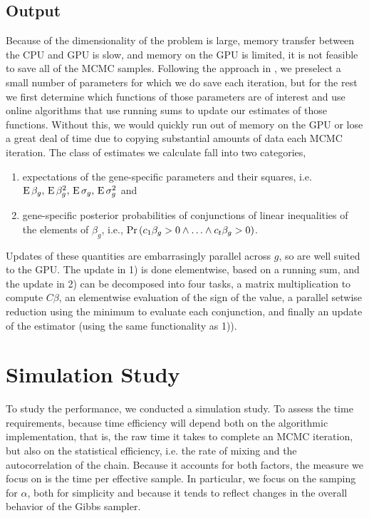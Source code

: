 \subsection{Output}
\label{subsec:output}
Because of the dimensionality of the problem is large, memory transfer between the CPU and GPU is slow, and memory on the GPU is limited, it is not feasible to save all of the MCMC samples. Following the approach in \citet{landau2016fully}, we preselect a small number of parameters for which we do save each iteration, but for the rest we first determine which functions of those parameters are of interest and use online algorithms that use running sums to update our estimates of those functions. Without this, we would quickly run out of memory on the GPU or lose a great deal of time due to copying substantial amounts of data each MCMC iteration. The class of estimates we calculate fall into two categories,
\begin{enumerate}
\item expectations of the gene-specific parameters and their squares, i.e. $\operatorname{E} \beta_g,\, \operatorname{E} \beta_g^2,\, \operatorname{E}\sigma_g,\, \operatorname{E}\sigma_g^2$ and 
\item gene-specific posterior probabilities of conjunctions of linear
  inequalities of the elements of $\beta_g$, i.e.,
  $\operatorname{Pr}\left(c_1\beta_g > 0 \land \ldots \land c_t\beta_g > 0\right)$.
\end{enumerate}
Updates of these quantities are embarrasingly parallel across $g$, so are well suited to the GPU. The update in 1) is done elementwise, based on a running sum, and the update in 2) can be decomposed into four tasks, a matrix multiplication to compute $C\beta$, an elementwise evaluation of the sign of the value, a parallel setwise reduction using the minimum to evaluate each conjunction, and finally an update of the estimator (using the same functionality as 1)).



\section{Simulation Study}
To study the performance, we conducted a simulation study. To assess the time requirements, because time efficiency will depend both on the algorithmic implementation, that is, the raw time it takes to complete an MCMC iteration, but also on the statistical efficiency, i.e. the rate of mixing and the autocorrelation of the chain. Because it accounts for both factors, the measure we focus on is the time per effective sample. In particular, we focus on the samping for $\alpha$, both for simplicity and because it tends to reflect changes in the overall behavior of the Gibbs sampler.

